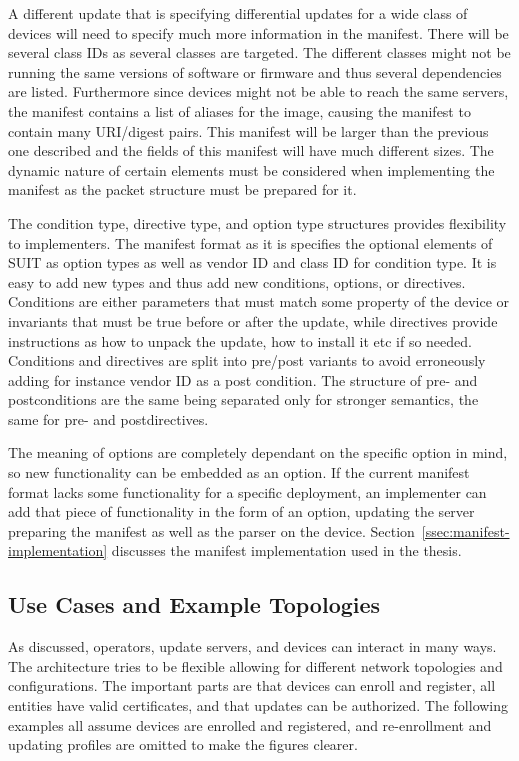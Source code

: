 \documentclass[0-thesis.tex]{subfiles}
\begin{document}
A different update that is specifying differential updates for a wide class of devices
will need to specify much more information in the manifest. There will be several class
IDs as several classes are targeted. The different classes might not be running the same
versions of software or firmware and thus several dependencies are listed. Furthermore
since devices might not be able to reach the same servers, the manifest contains a list of
aliases for the image, causing the manifest to contain many URI/digest pairs. This
manifest will be larger than the previous one described and the fields of this manifest
will have much different sizes. The dynamic nature of certain elements must be considered
when implementing the manifest as the packet structure must be prepared for it. 

The condition type, directive type, and option type structures provides flexibility to
implementers. The manifest format as it is specifies the optional elements of SUIT as
option types as well as vendor ID and class ID for condition type. It is easy to add new
types and thus add new conditions, options, or directives. Conditions are either
parameters that must match some property of the device or invariants that must be true
before or after the update, while directives provide instructions as how to unpack the
update, how to install it etc if so needed. Conditions and directives are split into
pre/post variants to avoid erroneously adding for instance vendor ID as a post condition.
The structure of pre- and postconditions are the same being separated only for stronger
semantics, the same for pre- and postdirectives.

The meaning of options are completely dependant on the specific option in mind, so new
functionality can be embedded as an option. If the current manifest format lacks some
functionality for a specific deployment, an implementer can add that piece of
functionality in the form of an option, updating the server preparing the manifest as well
as the parser on the device. Section~\ref{ssec:manifest-implementation} discusses the
manifest implementation used in the thesis.

\subsection{Use Cases and Example Topologies}
\label{ssec:use-cases-examples-topologies}
As discussed, operators, update servers, and devices can interact in many ways. The
architecture tries to be flexible allowing for different network topologies and
configurations. The important parts are that devices can enroll and register, all entities
have valid certificates, and that updates can be authorized. The following examples all
assume devices are enrolled and registered, and re-enrollment and updating profiles are
omitted to make the figures clearer.
\end{document}
